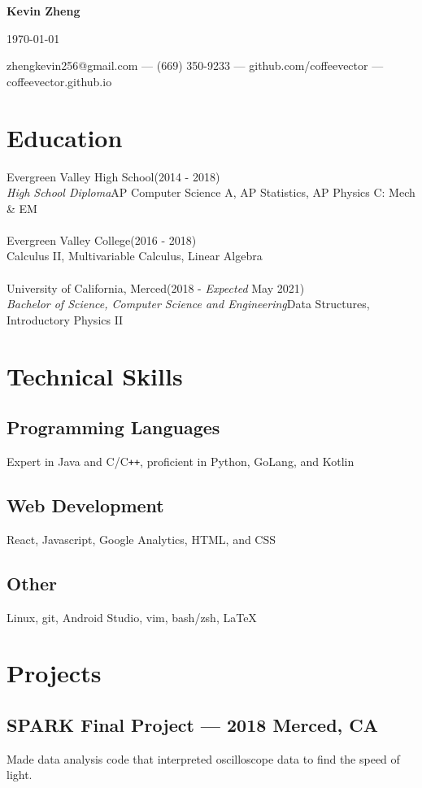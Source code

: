 \documentclass[letterpaper,12pt]{article}
\makeatletter
\newcommand\textbox[1]{%
	\parbox{.333\textwidth}{#1}%
}
\renewcommand{\maketitle}{
	\begin{center}
		\noindent\textbox{\hfill}\textbox{\hfil\bfseries\huge Kevin Zheng\hfil}\textbox{\hfill \today}
		{zhengkevin256@gmail.com --- (669) 350-9233 --- github.com/coffeevector --- coffeevector.github.io}
	\end{center} }
\makeatother
\begin{document}
\maketitle
\section{Education}
Evergreen Valley High School\null\hfill (2014 - 2018)\\
\emph{High School Diploma}\null\hfill AP Computer Science A, AP Statistics, AP Physics C: Mech \& EM\\~\\
Evergreen Valley College\null\hfill (2016 - 2018)\\
\null\hfill Calculus II, Multivariable Calculus, Linear Algebra\\~\\
University of California, Merced\null\hfill(2018 - \emph{Expected} May 2021)\\
\emph{Bachelor of Science, Computer Science and Engineering}\null\hfill Data Structures, Introductory Physics II
\section{Technical Skills}
	\subsection{Programming Languages}
	Expert in Java and C/C\verb!++!, proficient in Python, GoLang, and Kotlin
	\vspace*{-2mm}
	\subsection{Web Development}
	React, Javascript, Google Analytics, HTML, and CSS
	\vspace*{-2mm}
	\subsection{Other}
	Linux, git, Android Studio, vim, bash/zsh, {\LaTeX}
\section{Projects}
	\subsection{SPARK Final Project --- 2018 \null\hfill Merced, CA}
	\par Made data analysis code that interpreted oscilloscope data to find the speed of light.
\end{document}
